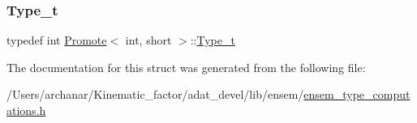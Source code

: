 \subsubsection{\texorpdfstring{Type\_t}{Type\_t}\hspace{0.1cm}{\footnotesize\ttfamily [2/2]}}
{\footnotesize\ttfamily typedef int \mbox{\hyperlink{structPromote}{Promote}}$<$ int, short $>$\+::\mbox{\hyperlink{structPromote_3_01int_00_01short_01_4_aeccdff5aed8403672c3c04fc17570d5e}{Type\+\_\+t}}}



The documentation for this struct was generated from the following file\+:\begin{DoxyCompactItemize}
\item 
/\+Users/archanar/\+Kinematic\+\_\+factor/adat\+\_\+devel/lib/ensem/\mbox{\hyperlink{lib_2ensem_2ensem__type__computations_8h}{ensem\+\_\+type\+\_\+computations.\+h}}\end{DoxyCompactItemize}
